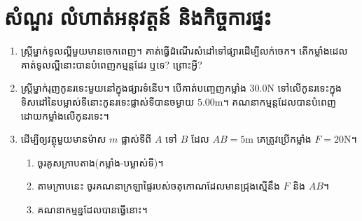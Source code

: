 \section{សំណួរ លំហាត់អនុវត្តន៍ និងកិច្ចការផ្ទះ}
\begin{enumerate}
	\item ស្រ្តីម្នាក់ទូលល្អីមួយមានចេកពេញ។ គាត់ធ្វើដំណើរសំដៅទៅផ្សារដើម្បីលក់ចេក។ តើកម្លាំងដេលគាត់ទូលល្អីនោះបានបំពេញកម្មន្តដែរ ឬទេ? ព្រោះអ្វី?
	\item ស្រ្តីម្នាក់រុញកូនរទេះមួយនៅក្នុងផ្សារទំនើប។ បើគាត់បញ្ចេញកម្លាំង $30.0\si{\newton}$ ទៅលើកូនរទេះក្នុងទិសដៅនៃបម្លាស់ទីនោះកូនរទេះផ្លាស់ទីបានចម្ងាយ $5.00\si{\metre}$។ គណនាកម្មន្តដែលបានបំពេញដោយកម្លាំងលើកូនរទេះ។
	\item ដើម្បីឲ្យវត្ថុមួយមានម៉ាស $m$ ផ្លាស់ទីពី $A$ ទៅ $B$ ដែល $AB=5\si{\metre}$ គេត្រូវប្រើកម្លាំង $F=20\si{\newton}$។
	\begin{enumerate}
		\item ចូរគូសក្រាបតាង(កម្លាំង-បម្លាស់ទី)។
		\item តាមក្រាបនេះ ចូរគណនាក្រឡាផ្ទៃរបស់ចតុកោណដែលមានជ្រុងស្មើនឹង $F$ និង $AB$។
		\item គណនាកម្មន្នដែលបានធ្វើនោះ។
	\end{enumerate} 
	\begin{figure}[H]
		\centering
	\end{figure}
\end{enumerate}